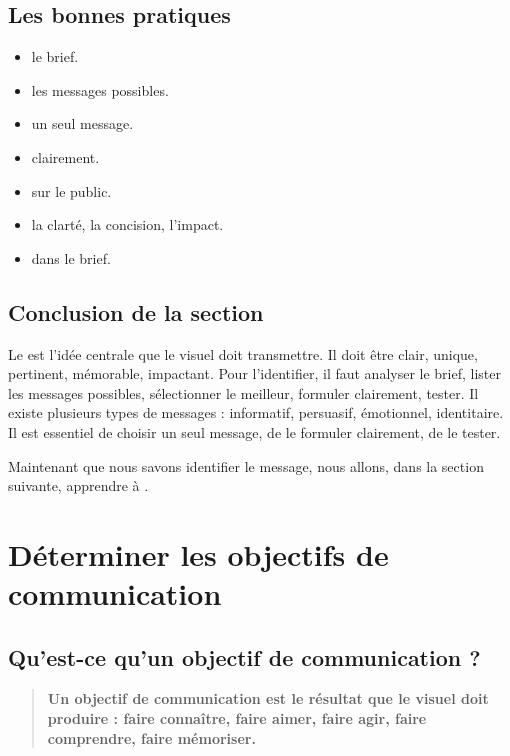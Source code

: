 \subsection{Les bonnes pratiques}

\begin{itemize}
    \item {} le brief.
    \item {} les messages possibles.
    \item {} un seul message.
    \item {} clairement.
    \item {} sur le public.
    \item {} la clarté, la concision, l'impact.
    \item {} dans le brief.
\end{itemize}

\subsection*{Conclusion de la section}

Le  est l'idée centrale que le visuel doit transmettre. Il doit être clair, unique, pertinent, mémorable, impactant. Pour l'identifier, il faut analyser le brief, lister les messages possibles, sélectionner le meilleur, formuler clairement, tester. Il existe plusieurs types de messages : informatif, persuasif, émotionnel, identitaire. Il est essentiel de choisir un seul message, de le formuler clairement, de le tester.

Maintenant que nous savons identifier le message, nous allons, dans la section suivante, apprendre à .

\section{Déterminer les objectifs de communication}

\subsection{Qu'est-ce qu'un objectif de communication ?}

\begin{quote}
\textbf{Un objectif de communication est le résultat que le visuel doit produire : faire connaître, faire aimer, faire agir, faire comprendre, faire mémoriser.}
\end{quote}

